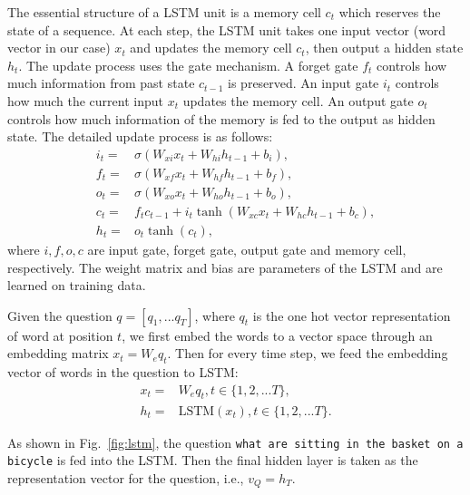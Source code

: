 \documentclass[10pt,twocolumn,letterpaper]{article}
\begin{document}
The essential structure of a LSTM unit is a memory cell $c_{t}$ which reserves
the state of a sequence. At each step, the LSTM unit takes one input vector
(word vector in our case) $x_{t}$ and updates the memory cell $c_{t}$, then
output a hidden state $h_{t}$. The update process uses the gate mechanism. A
forget gate $f_{t}$ controls how much information from past state $c_{t-1}$ is
preserved. An input gate $i_{t}$ controls how much the current input $x_{t}$
updates the memory cell. An output gate $o_{t}$ controls how much information
of the memory is fed to the output as hidden state. The detailed update process
is as follows:
\begin{align}
  i_{t} =& \sigma(W_{xi}x_{t} + W_{hi}h_{t-1} + b_{i}), \\
  f_{t} =& \sigma(W_{xf}x_{t} + W_{hf}h_{t-1} + b_{f}), \\
  o_{t} =& \sigma(W_{xo}x_{t} + W_{ho}h_{t-1} + b_{o}), \\
  c_{t} =& f_{t}c_{t-1} + i_{t}\tanh(W_{xc}x_{t} + W_{hc}h_{t-1} + b_{c}), \\
  h_{t} =& o_{t}\tanh(c_{t}),
\end{align}
where $i, f, o, c$ are input gate, forget gate, output gate and memory cell,
respectively. The weight matrix and bias are parameters of the LSTM and are
learned on training data.

Given the question $q = [q_{1}, ...q_{T}]$, where $q_{t}$ is the one hot vector
representation of word at position $t$, we first embed the words to a vector
space through an embedding matrix $x_{t} = W_{e}q_{t}$. Then for every time
step, we feed the embedding vector of words in the question to LSTM:
\begin{align}
  x_{t} =& W_{e}q_{t}, t\in \{1,2,...T\}, \\
  h_{t} =& \text{LSTM}(x_{t}), t\in \{1,2,...T\}.
\end{align}

As shown in Fig.~\ref{fig:lstm}, the question \texttt{what are sitting in the
  basket on a bicycle} is fed into the LSTM. Then the final hidden layer is
taken as the representation vector for the question, i.e., $v_{Q} = h_{T}$.
\end{document}
